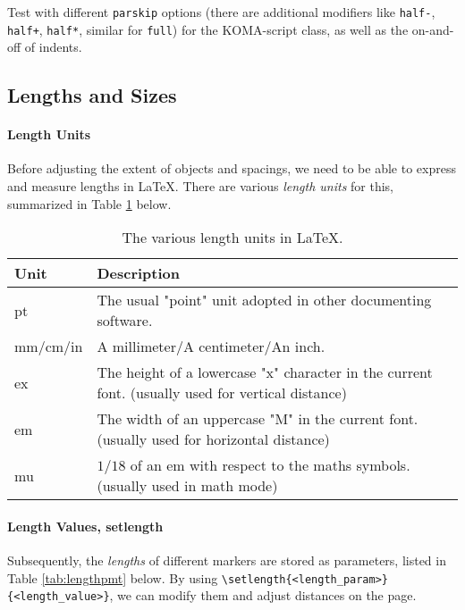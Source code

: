 \begin{exercisebox}
\begin{Exercise}
Test with different \verb|parskip| options (there are additional modifiers like \verb|half-|, \verb|half+|, \verb|half*|, similar for \verb|full|) for the KOMA-script class, as well as the on-and-off of indents.     
\end{Exercise}
\end{exercisebox}

\subsection{Lengths and Sizes}

\paragraph{Length Units}
Before adjusting the extent of objects and spacings, we need to be able to express and measure lengths in \LaTeX{}. There are various \textit{length units} for this, summarized in Table \ref{tab:lengthunit} below.
\begin{table}
\begin{tabularx}{\textwidth}{|l|X|}
\hline
Unit & Description \\
\hline
pt & The usual "point" unit adopted in other documenting software. \\
\hline
mm/cm/in & A millimeter/A centimeter/An inch. \\
\hline
ex & The height of a lowercase "x" character in the current font. (usually used for vertical distance) \\
\hline
em & The width of an uppercase "M" in the current font. (usually used for horizontal distance) \\
\hline
mu & $1/18$ of an em with respect to the maths symbols. (usually used in math mode) \\
\hline
\end{tabularx}
\caption{The various length units in \LaTeX{}.}
\label{tab:lengthunit}
\end{table}

\paragraph{Length Values, setlength}
Subsequently, the \textit{lengths} of different markers are stored as parameters, listed in Table \ref{tab:lengthpmt} below. By using \texttt{\textbackslash setlength\allowbreak\{<length\_param>\}\{<length\_value>\}}, we can modify them and adjust distances on the page.

